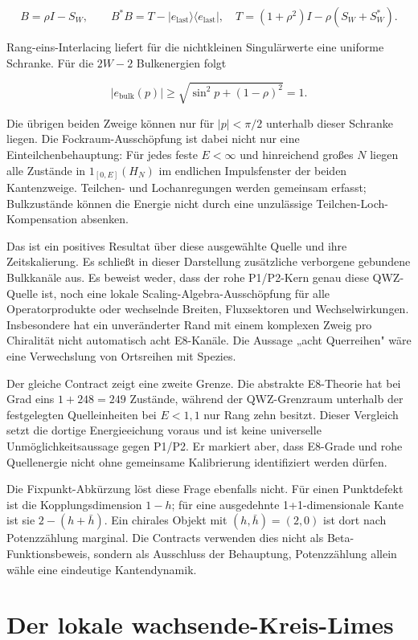 \documentclass[11pt,a4paper,oneside,parskip=half,headings=normal,numbers=noenddot,bibliography=totoc]{scrreprt}
\begin{document}
\[
 B=\rho I-S_W,
\qquad B^*B=T-|e_\mathrm{last}\rangle\langle e_\mathrm{last}|,
\quad T=(1+\rho^2)I-\rho(S_W+S_W^*).
\]

Rang-eins-Interlacing liefert für die nichtkleinen Singulärwerte eine
uniforme Schranke. Für die $2W-2$ Bulkenergien folgt

\[
 |e_\mathrm{bulk}(p)|\ge
 \sqrt{\sin^2p+(1-\rho)^2}=1.
\]

Die übrigen beiden Zweige können nur für \(|p|<\pi/2\) unterhalb dieser
Schranke liegen. Die Fockraum-Ausschöpfung ist dabei nicht nur eine
Einteilchenbehauptung: Für jedes feste \(E<\infty\) und hinreichend großes \(N\) liegen alle Zustände in \(1_{[0,E]}(H_N)\) im endlichen Impulsfenster der beiden Kantenzweige. Teilchen- und Lochanregungen werden gemeinsam
erfasst; Bulkzustände können die Energie nicht durch eine unzulässige
Teilchen-Loch-Kompensation absenken.

Das ist ein positives Resultat über diese ausgewählte Quelle und ihre
Zeitskalierung. Es schließt in dieser Darstellung zusätzliche verborgene
gebundene Bulkkanäle aus. Es beweist weder, dass der rohe P1/P2-Kern genau
diese QWZ-Quelle ist, noch eine lokale Scaling-Algebra-Ausschöpfung für alle
Operatorprodukte oder wechselnde Breiten, Fluxsektoren und Wechselwirkungen.
Insbesondere hat ein unveränderter Rand mit einem komplexen Zweig pro
Chiralität nicht automatisch acht E8-Kanäle. Die Aussage „acht Querreihen"
wäre eine Verwechslung von Ortsreihen mit Spezies.

Der gleiche Contract zeigt eine zweite Grenze. Die abstrakte E8-Theorie hat
bei Grad eins $1+248=249$ Zustände, während der QWZ-Grenzraum unterhalb der
festgelegten Quelleinheiten bei \(E<1{,}1\) nur Rang zehn besitzt. Dieser
Vergleich setzt die dortige Energieeichung voraus und ist keine universelle
Unmöglichkeitsaussage gegen P1/P2. Er markiert aber, dass E8-Grade und rohe
Quellenergie nicht ohne gemeinsame Kalibrierung identifiziert werden dürfen.

Die Fixpunkt-Abkürzung löst diese Frage ebenfalls nicht. Für einen
Punktdefekt ist die Kopplungsdimension $1-h$; für eine ausgedehnte
1+1-dimensionale Kante ist sie $2-(h+\bar h)$. Ein chirales Objekt mit
$(h,\bar h)=(2,0)$ ist dort nach Potenzzählung marginal. Die Contracts
verwenden dies nicht als Beta-Funktionsbeweis, sondern als Ausschluss der
Behauptung, Potenzzählung allein wähle eine eindeutige Kantendynamik.

\section{Der lokale wachsende-Kreis-Limes}
\end{document}

